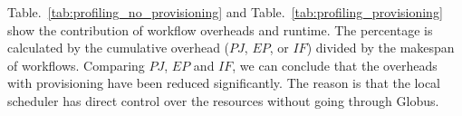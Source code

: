 Table.~\ref{tab:profiling_no_provisioning} and Table.~\ref{tab:profiling_provisioning} show the contribution of workflow overheads and runtime. The percentage is calculated by the cumulative overhead ($PJ$, $EP$, or $IF$) divided by the makespan of workflows. Comparing $PJ$, $EP$ and $IF$, we can conclude that the overheads with provisioning have been reduced significantly. The reason is that the local scheduler has direct control over the resources without going through Globus. 


